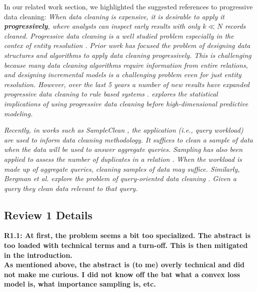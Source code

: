 \vspace{0.5em}
In our related work section, we highlighted the suggested references to progressive data cleaning:
\emph{When data cleaning is expensive, it is desirable to apply it \textbf{progressively}, where analysts can inspect early results with only $k \ll N$ records cleaned.
Progressive data cleaning is a well studied problem especially in the contex of entity resolution \cite{altowim2014progressive, whang2014incremental, papenbrock2015progressive, gruenheid2014incremental}.
Prior work has focused the problem of designing data structures and algorithms to apply data cleaning progressively.
This is challenging because many data cleaning algorithms require information from entire relations, and designing incremental models is a challenging problem even for just entity resolution.
However, over the last 5 years a number of new results have expanded progressive data cleaning to rule based systems \cite{mayfield2010eracer, DBLP:journals/pvldb/YakoutENOI11, yakout2013don}.
\sys explores the statistical implications of using progressive data cleaning before high-dimensional predictive modeling.}

\vspace{0.5em}

\emph{Recently, in works such as SampleClean \cite{wang1999sample}, the application (i.e., query workload) are used to inform data cleaning methodology.
It suffices to clean a sample of data when the data will be used to answer aggregate queries.
Sampling has also been applied to assess the number of duplicates in a relation \cite{heise2014estimating}.
When the workload is made up of aggregate queries, cleaning samples of data may suffice. 
Similarly, Bergman et al. explore the problem of query-oriented data cleaning \cite{DBLP:conf/sigmod/BergmanMNT15}. Given a query they clean data relevant to that query. }

\subsection*{Review 1 Details} 

\noindent\textbf{R1.1: At first, the problem seems a bit too specialized. The abstract is too loaded with technical terms and a turn-off. This is then mitigated in the introduction. \\
As mentioned above, the abstract is (to me) overly technical and did not make me curious. I did not know off the bat what a convex loss model is, what importance sampling is, etc.}

